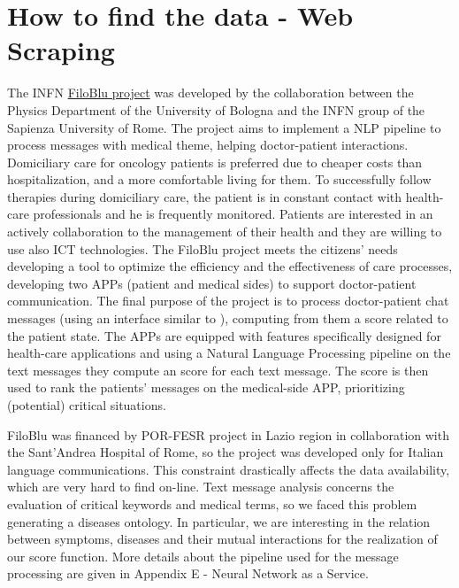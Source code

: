 \documentclass{standalone}
\begin{document}
\section[Web Scraping]{How to find the data - Web Scraping}\label{chimera:web_scraping}

The INFN \href{https://agenda.infn.it/event/16961/contributions/34949/attachments/24579/28029/filoblu_0312.pdf}{FiloBlu project} was developed by the collaboration between the Physics Department of the University of Bologna and the INFN group of the Sapienza University of Rome.
The project aims to implement a NLP pipeline to process messages with medical theme, helping doctor-patient interactions.
Domiciliary care for oncology patients is preferred due to cheaper costs than hospitalization, and a more comfortable living for them.
To successfully follow therapies during domiciliary care, the patient is in constant contact with health-care professionals and he is frequently monitored.
Patients are interested in an actively collaboration to the management of their health and they are willing to use also ICT technologies.
The FiloBlu project meets the citizens' needs developing a tool to optimize the efficiency and the effectiveness of care processes, developing two APPs (patient and medical sides) to support doctor-patient communication.
The final purpose of the project is to process doctor-patient chat messages (using an interface similar to ), computing from them a score related to the patient state.
The APPs are equipped with features specifically designed for health-care applications and using a Natural Language Processing pipeline on the text messages they compute an  score for each text message.
The  score is then used to rank the patients' messages on the medical-side APP, prioritizing (potential) critical situations.

FiloBlu was financed by POR-FESR project in Lazio region in collaboration with the Sant'Andrea Hospital of Rome, so the project was developed only for Italian language communications.
This constraint drastically affects the data availability, which are very hard to find on-line.
Text message analysis concerns the evaluation of critical keywords and medical terms, so we faced this problem generating a diseases ontology.
In particular, we are interesting in the relation between symptoms, diseases and their mutual interactions for the realization of our score function.
More details about the pipeline used for the message processing are given in Appendix E - Neural Network as a Service.
\end{document}
